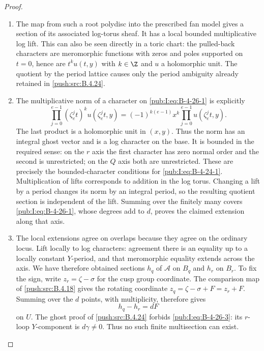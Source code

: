 \begin{proof}
\begin{enumerate}[label=\arabic*.,leftmargin=*]
\item The map from such a root polydisc into the
prescribed fan model gives a section of its
associated log-torus sheaf. It has a local bounded
multiplicative log lift. This can also be seen
directly in a toric chart: the pulled-back characters
are meromorphic functions with zeros and poles
supported on $t=0$, hence are $t^k u(t,y)$ with
$k\in\Z$ and $u$ a holomorphic unit. The quotient
by the period lattice causes only the period
ambiguity already retained in \ref{push:src:B.4.24}.

\item The multiplicative norm of a character on \eqref{pub:I:eq:B-4-26-1}
is explicitly
\begin{equation}
 \prod_{j=0}^{e-1}(\zeta_e^j t)^k
              u(\zeta_e^j t,y)
 =(-1)^{k(e-1)}x^k
              \prod_{j=0}^{e-1}u(\zeta_e^j t,y).
\label{pub:I:eq:B-4-26-2}
\end{equation}
The last product is a holomorphic unit in $(x,y)$.
Thus the norm has an integral ghost vector and
is a log character on the base. It is
bounded in the required sense: on the $r$ axis
the first character has zero normal order and
the second is unrestricted; on the $Q$ axis
both are unrestricted. These are precisely the
bounded-character conditions for \eqref{pub:I:eq:B-4-24-1}.
Multiplication of lifts corresponds to addition
in the log torus. Changing a lift by a period
changes its norm by an integral period, so the
resulting quotient section is independent of
the lift. Summing over the finitely many covers
\eqref{pub:I:eq:B-4-26-1}, whose degrees add to $d$, proves the
claimed extension along that axis.

\item The local extensions agree on overlaps because
they agree on the ordinary locus. Lift locally to log characters:
agreement there is an equality up to a locally constant $Y$-period,
and that meromorphic equality extends across the axis.
We have therefore obtained sections $h_q$ of $\mathcal A$ on
$B_q$ and $h_r$ on $B_r$.
To fix the sign, write $z_r=\zeta-\sigma$ for the cusp group
coordinate. The comparison map of \ref{push:src:B.4.18} gives the
rotating coordinate $z_q=\zeta-\sigma+F=z_r+F$.
Summing over the $d$ points, with multiplicity, therefore gives
\begin{equation}
 h_q-h_r=dF
\label{pub:I:eq:B-4-26-3}
\end{equation}
on $U$. The ghost proof of \ref{push:src:B.4.24} forbids
\eqref{pub:I:eq:B-4-26-3}: its $r$-loop $Y$-component is
$d\gamma\ne0$. Thus no such finite multisection can exist.


\end{enumerate}
\end{proof}
